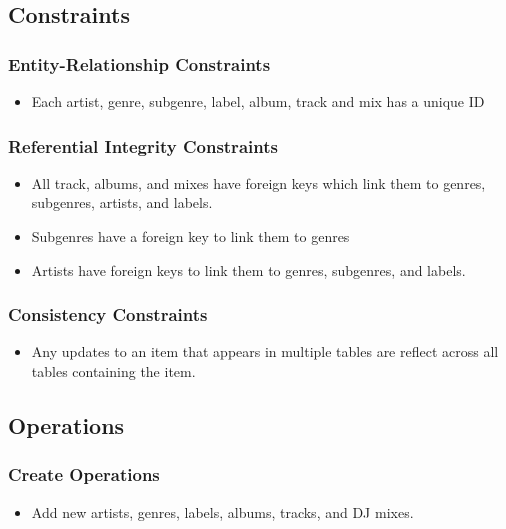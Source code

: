 \documentclass{article}
\begin{document}
\subsection{Constraints}

\subsubsection{Entity-Relationship Constraints}
\begin{itemize}
    \item Each artist, genre, subgenre, label, album, track and mix has a unique ID
\end{itemize}

\subsubsection{Referential Integrity Constraints}
\begin{itemize}
    \item All track, albums, and mixes have foreign keys which link them to genres, subgenres, artists, and labels.
    \item Subgenres have a foreign key to link them to genres
    \item Artists have foreign keys to link them to genres, subgenres, and labels.
\end{itemize}

\subsubsection{Consistency Constraints}
\begin{itemize}
    \item Any updates to an item that appears in multiple tables are reflect across all tables containing the item.
\end{itemize}

\subsection{Operations}

\subsubsection{Create Operations}
\begin{itemize}
    \item Add new artists, genres, labels, albums, tracks, and DJ mixes.
\end{itemize}
\end{document}
